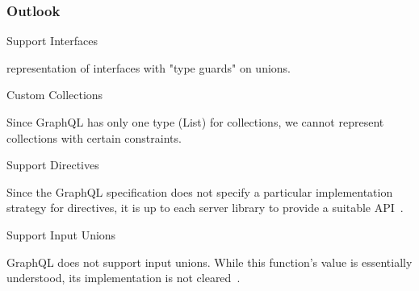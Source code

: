 \begin{frame}\frametitle{Outlook}

\begin{block}{Support Interfaces}

    representation of interfaces with "type guards" on unions. 

\end{block}




\begin{block}{Custom Collections}

Since GraphQL has only one type (List) for collections, we cannot represent collections with certain constraints. 

\end{block}

\begin{block}{Support Directives} 

Since the GraphQL specification does not specify a particular implementation strategy for directives, it is up to each server library to provide a suitable API~\cite{schema-directives}.

\end{block}

\begin{block}{Support Input Unions} 

GraphQL does not support input unions. While this function's value is essentially understood, its implementation is not cleared~\cite{gql-spec-input-unions}. 

\end{block}

\end{frame}
